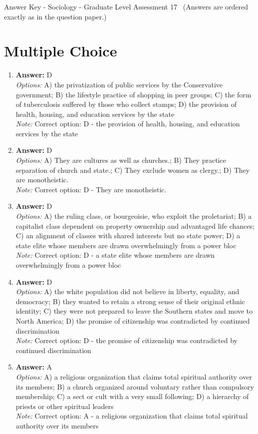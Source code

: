 \documentclass[12pt]{article}
\begin{document}
\begin{center}
Answer Key - Sociology - Graduate Level Assessment 17 \
\small (Answers are ordered exactly as in the question paper.)
\end{center}

\section*{Multiple Choice}
\begin{enumerate}[label=\arabic*.]
\item \textbf{Answer:} D
\\ \textit{Options:} A) the privatization of public services by the Conservative government; B) the lifestyle practice of shopping in peer groups; C) the form of tuberculosis suffered by those who collect stamps; D) the provision of health, housing, and education services by the state
\\ \textit{Note:} Correct option: D - the provision of health, housing, and education services by the state
\item \textbf{Answer:} D
\\ \textit{Options:} A) They are cultures as well as churches.; B) They practice separation of church and state.; C) They exclude women as clergy.; D) They are monotheistic.
\\ \textit{Note:} Correct option: D - They are monotheistic.
\item \textbf{Answer:} D
\\ \textit{Options:} A) the ruling class, or bourgeoisie, who exploit the proletariat; B) a capitalist class dependent on property ownership and advantaged life chances; C) an alignment of classes with shared interests but no state power; D) a state elite whose members are drawn overwhelmingly from a power bloc
\\ \textit{Note:} Correct option: D - a state elite whose members are drawn overwhelmingly from a power bloc
\item \textbf{Answer:} D
\\ \textit{Options:} A) the white population did not believe in liberty, equality, and democracy; B) they wanted to retain a strong sense of their original ethnic identity; C) they were not prepared to leave the Southern states and move to North America; D) the promise of citizenship was contradicted by continued discrimination
\\ \textit{Note:} Correct option: D - the promise of citizenship was contradicted by continued discrimination
\item \textbf{Answer:} A
\\ \textit{Options:} A) a religious organization that claims total spiritual authority over its members; B) a church organized around voluntary rather than compulsory membership; C) a sect or cult with a very small following; D) a hierarchy of priests or other spiritual leaders
\\ \textit{Note:} Correct option: A - a religious organization that claims total spiritual authority over its members
\end{enumerate}
\end{document}
